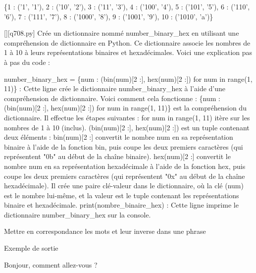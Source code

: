 \{1 : ('1', '1'), 2 : ('10', '2'), 3 : ('11', '3'), 4 : ('100', '4'), 5 : ('101', '5'), 6 : ('110', '6'), 7 : ('111', '7'), 8 : ('1000', '8'), 9 : ('1001', '9'), 10 : ('1010', 'a')\}
        \par
        \begin{solution}
            \renewcommand{\nomfichier}{q708.py}
            \pythonfile{\chemincode \nomfichier}[][\nomfichier]
            Crée un dictionnaire nommé number\_binary\_hex en utilisant une compréhension de dictionnaire en Python. Ce dictionnaire associe les nombres de 1 à 10 à leurs représentations binaires et hexadécimales. Voici une explication pas à pas du code :

    number\_binary\_hex = \{num : (bin(num)[2 :], hex(num)[2 :]) for num in range(1, 11)\} : Cette ligne crée le dictionnaire number\_binary\_hex à l'aide d'une compréhension de dictionnaire. Voici comment cela fonctionne :
        \{num : (bin(num)[2 :], hex(num)[2 :]) for num in range(1, 11)\} est la compréhension du dictionnaire. Il effectue les étapes suivantes :
        for num in range(1, 11) itère sur les nombres de 1 à 10 (inclus).
        (bin(num)[2 :], hex(num)[2 :]) est un tuple contenant deux éléments :
            bin(num)[2 :] convertit le nombre num en sa représentation binaire à l'aide de la fonction bin, puis coupe les deux premiers caractères (qui représentent "0b" au début de la chaîne binaire).
            hex(num)[2 :] convertit le nombre num en sa représentation hexadécimale à l'aide de la fonction hex, puis coupe les deux premiers caractères (qui représentent "0x" au début de la chaîne hexadécimale).
        Il crée une paire clé-valeur dans le dictionnaire, où la clé (num) est le nombre lui-même, et la valeur est le tuple contenant les représentations binaire et hexadécimale.
    print(nombre\_binaire\_hex) : Cette ligne imprime le dictionnaire number\_binary\_hex sur la console.
        \end{solution}
        

        \question
        Mettre en correspondance les mots et leur inverse dans une phrase

Exemple de sortie

Bonjour, comment allez-vous ?

